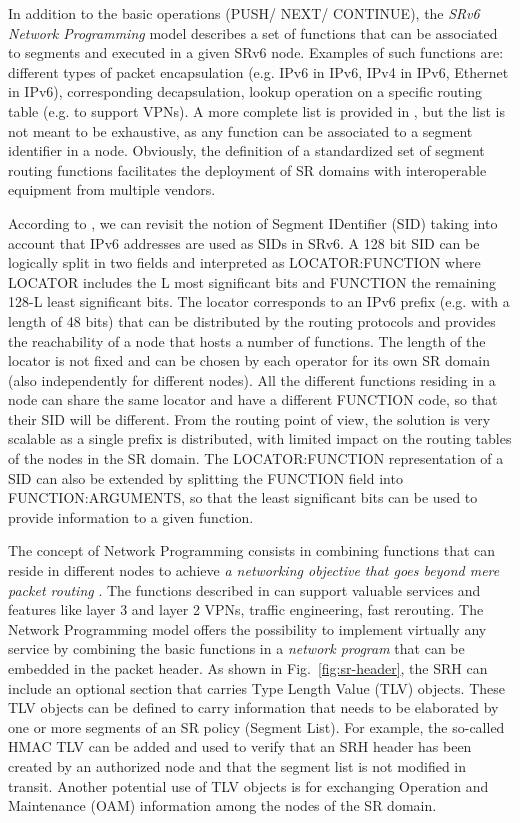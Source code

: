 In addition to the basic operations (PUSH/ NEXT/ CONTINUE), the \textit{SRv6 Network Programming} model \cite{id-srv6-network-prog} describes a set of functions that can be associated to segments and executed in a given SRv6 node. Examples of such functions are: different types of packet encapsulation (e.g. IPv6 in IPv6, IPv4 in IPv6, Ethernet in IPv6), corresponding decapsulation, lookup operation on a specific routing table (e.g. to support VPNs). A more complete list is provided in \cite{id-srv6-network-prog}, but the list is not meant to be exhaustive, as any function can be associated to a segment identifier in a node. Obviously, the definition of a standardized set of segment routing functions facilitates the deployment of SR domains with interoperable equipment from multiple vendors. 

According to \cite{id-srv6-network-prog}, we can revisit the notion of Segment IDentifier (SID) taking into account that IPv6 addresses are used as SIDs in SRv6. A 128 bit SID can be logically split in two fields and interpreted as LOCATOR:FUNCTION where LOCATOR includes the L most significant bits and FUNCTION the remaining 128-L least significant bits. The locator corresponds to an IPv6 prefix (e.g. with a length of 48 bits) that can be distributed by the routing protocols and provides the reachability of a node that hosts a number of functions. The length of the locator is not fixed and can be chosen by each operator for its own SR domain (also independently for different nodes). All the different functions residing in a node can share the same locator and have a different FUNCTION code, so that their SID will be different. From the routing point of view, the solution is very scalable as a single prefix is distributed, with limited impact on the routing tables of the nodes in the SR domain. The LOCATOR:FUNCTION representation of a SID can also be extended by splitting the FUNCTION field into FUNCTION:ARGUMENTS, so that the least significant bits can be used to provide information to a given function.

The concept of Network Programming consists in combining functions that can reside in different nodes to achieve \textit{a networking objective that goes beyond mere packet routing} \cite{id-srv6-network-prog}. The functions described in \cite{id-srv6-network-prog} can support valuable services and features like layer 3 and layer 2 VPNs, traffic engineering, fast rerouting. The Network Programming model offers the possibility to implement virtually any service by combining the basic functions in a \textit{network program} that can be embedded in the packet header. As shown in Fig.~\ref{fig:sr-header}, the SRH can include an optional section that carries Type Length Value (TLV) objects. These TLV objects can be defined to carry information that needs to be elaborated by one or more segments of an SR policy (Segment List). For example, the so-called HMAC TLV can be added and used to verify that an SRH header has been created by an authorized node and that the segment list is not modified in transit. Another potential use of TLV objects is for exchanging Operation and Maintenance (OAM) information among the nodes of the SR domain. 

